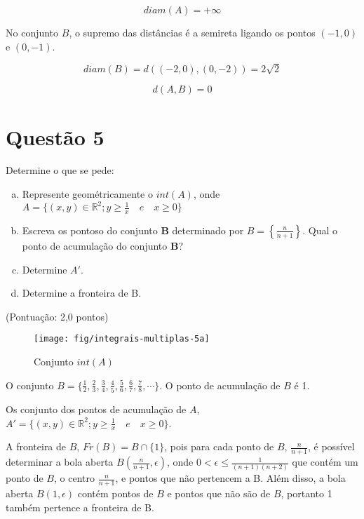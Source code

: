 \documentclass[10pt,a4paper]{article}
\begin{document}
	\begin{equation}
		diam(A) = +\infty
	\end{equation}
	
	No conjunto $B$, o supremo das distâncias é a semireta ligando os pontos $(-1, 0)$ e $(0, -1)$.
	
	\begin{equation}
		diam(B) = d((-2, 0), (0, -2)) = 2\sqrt{2}
	\end{equation}
	
	\begin{equation}
		d(A, B) = 0
	\end{equation}
	
	\section*{Questão 5}
	
	Determine o que se pede:
	
	\begin{enumerate}[a)]
		\item Represente geométricamente o $int(A)$, onde $A = \{ (x, y) \in \mathbb{R}^2; y \ge \frac{1}{x} \quad e \quad x \ge 0\}$
		\item Escreva os pontoso do conjunto $\textbf{B}$ determinado por $B = \left\{ \frac{n}{n+1}\right\} $. Qual o ponto de acumulação do conjunto \textbf{B}?
		\item Determine $A'$.
		\item Determine a fronteira de $\text{B}$.
	\end{enumerate}
	(Pontuação: 2,0 pontos)
	
	\begin{figure}[h]
		\centering
		\texttt{[image: fig/integrais-multiplas-5a]}
		\caption{Conjunto $ int(A) $}
		\label{fig:integrais-multiplas-5a}
	\end{figure}
	
	O conjunto $ B = \{ \frac{1}{2}, \frac{2}{3}, \frac{3}{4}, \frac{4}{5}, \frac{5}{6}, \frac{6}{7}, \frac{7}{8}, \cdots \} $. O ponto de acumulação de $B$ é 1.
	
	Os conjunto dos pontos de acumulação de $A$, $A' = \{(x, y) \in \mathbb{R}^2; y \ge \frac{1}{x} \quad e \quad x \ge 0 \} $.
	
	A fronteira de $B$, $Fr(B) = B \cap \{1\} $, pois para cada ponto de $B$, $\frac{n}{n+1}$, é possível determinar a bola aberta $B \left( \frac{n}{n+1}, \epsilon \right)$, onde $0 < \epsilon \le \frac{1}{(n+1)(n+2)} $ que contém um ponto de $B$, o centro $\frac{n}{n+1}$, e pontos que não pertencem a B. Além disso, a bola aberta $ B \left(1, \epsilon \right) $ contém pontos de $B$ e pontos que não são de $B$, portanto 1 também pertence a fronteira de B.
	
\end{document}
